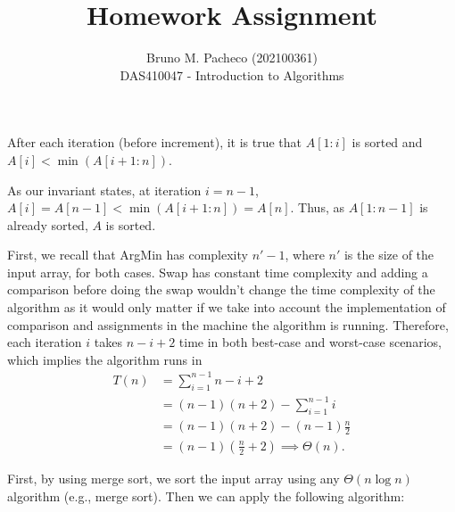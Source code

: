 \documentclass[a4paper]{report}
\begin{document}
 
\title{Homework Assignment}
\author{Bruno M. Pacheco (202100361) \\
DAS410047 - Introduction to Algorithms}
 
\maketitle
 

\begin{algorithm}[H]
\end{algorithm}


After each iteration (before increment), it is true that $A[1:i]$ is sorted and $A[i] < \min \left( A[i+1:n] \right) $.


As our invariant states, at iteration $i= n-1$, $A[i] = A[n-1] < \min\left( A[i+1:n] \right) = A[n]$. Thus, as $A[1:n-1]$ is already sorted, $A$ is sorted.


    First, we recall that ArgMin has complexity $n'-1$, where $n'$ is the size of the input array, for both cases. Swap has constant time complexity and adding a comparison before doing the swap wouldn't change the time complexity of the algorithm as it would only matter if we take into account the implementation of comparison and assignments in the machine the algorithm is running. Therefore, each iteration $i$ takes $n-i+2$ time in both best-case and worst-case scenarios, which implies the algorithm runs in
\begin{align*}
    T(n) &= \sum_{i=1}^{n-1} n-i+2 \\
	&= \left( n-1 \right) \left( n+2 \right) - \sum_{i=1}^{n-1} i \\
	&= \left( n-1 \right) \left( n+2 \right) - \left( n-1 \right) \frac{n}{2} \\
	&= \left( n-1 \right) \left( \frac{n}{2} + 2 \right) \implies \Theta\left( n \right)
.\end{align*}


First, by using merge sort, we sort the input array using any $\Theta\left( n \log n \right) $ algorithm (e.g., merge sort). Then we can apply the following algorithm:
\end{document}
